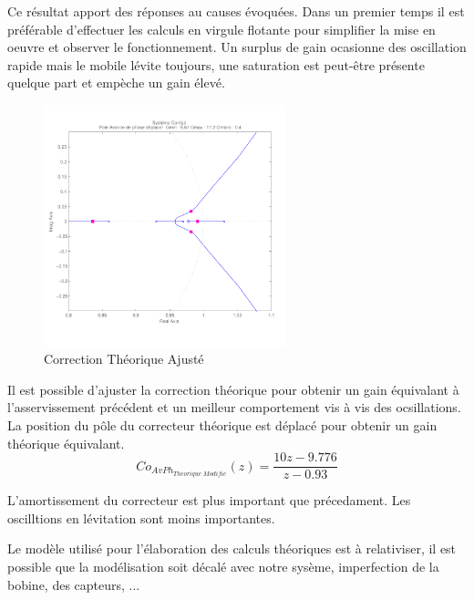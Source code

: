 \documentclass[11pt, french]{article} %
\begin{document}
Ce résultat apport des réponses au causes évoquées. Dans un premier temps il est préférable d'effectuer les calculs en virgule flotante pour simplifier la mise en oeuvre et observer le fonctionnement. Un surplus de gain ocasionne des oscillation rapide mais le mobile lévite toujours, une saturation est peut-être présente quelque part et empèche un gain élevé.

\begin{figure}
	\vspace{-0.5cm}
	\includegraphics[width = 7cm,trim=0 1.4cm 0 0.7cm ,clip=true]
					{SolutionNumerique/SystemeCorrigeThoriqueAdapte.pdf}
	\caption{Correction Théorique Ajusté}
\end{figure}
Il est possible d'ajuster la correction théorique pour obtenir un gain équivalant à l'asservissement précédent et un meilleur comportement vis à vis des ocsillations. La position du pôle du correcteur théorique est déplacé pour obtenir un gain théorique équivalant. 
\[  Co_{AvPh_{Theorique \; Modifie}}(z) = \dfrac {10z - 9.776} {z - 0.93} \]

L'amortissement du correcteur est plus important que précedament. Les oscilltions en lévitation sont moins importantes.

Le modèle utilisé pour l'élaboration des calculs théoriques est à relativiser, il est possible que la modélisation soit décalé avec notre sysème, imperfection de la bobine, des capteurs, ...

%
%
%
%
%
%
\end{document}
